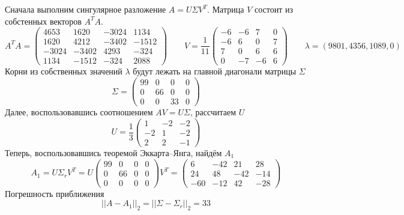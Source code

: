 Сначала выполним сингулярное разложение $A = U \Sigma V^T$. Матрица $V$
состоит из собстенных векторов $A^TA$.
\begin{equation*}
    A^TA = \begin{pmatrix}
        4653 & 1620 & -3024 & 1134\\
        1620 & 4212 & -3402 & -1512\\
        -3024 & -3402 & 4293 & -324\\
        1134 & -1512 & -324 & 2088
    \end{pmatrix}
    \qquad
    V = \frac{1}{11}
    \begin{pmatrix}
        -6 & -6 & 7 & 0\\
        -6 & 6 & 0 & 7\\
        7 & 0 & 6 & 6\\
        0 & -7 & -6 & 6
    \end{pmatrix}
    \qquad
    \lambda = (9801, 4356, 1089, 0)
\end{equation*}
Корни из собственных значений $\lambda$ будут лежать на главной диагонали
матрицы $\Sigma$
\begin{equation*}
    \Sigma = \begin{pmatrix}
        99 & 0 & 0 & 0\\
        0 & 66 & 0 & 0\\
        0 & 0 & 33 & 0
    \end{pmatrix}
\end{equation*}
Далее, воспользовавшись соотношением $AV = U\Sigma$, рассчитаем $U$
\begin{equation*}
    U = \frac{1}{3}
    \begin{pmatrix}
        1 & -2 & -2\\
        -2 & 1 & -2\\
        2 & 2 & -1
    \end{pmatrix}
\end{equation*}
Теперь, воспользовавшись теоремой Эккарта--Янга, найдём $A_1$
\begin{equation*}
    A_1 = U \Sigma_r V^T = U
    \begin{pmatrix}
        99 & 0 & 0 & 0\\
        0 & 66 & 0 & 0\\
        0 & 0 & 0 & 0
    \end{pmatrix}
    V^T =
    \begin{pmatrix}
        6 & -42 & 21 & 28\\
        24 & 48 & -42 & -14\\
        -60 & -12 & 42 & -28
    \end{pmatrix}
\end{equation*}
Погрешность приближения
\begin{equation*}
    ||A - A_1||_2 = ||\Sigma - \Sigma_r||_2 = 33
\end{equation*}


